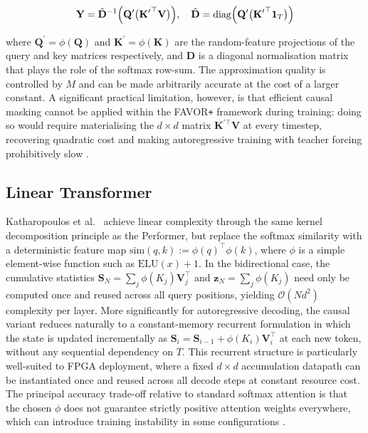 \begin{equation}
  \mathbf{Y} = \hat{\mathbf{D}}^{-1}\Bigl(
    \mathbf{Q}^\prime\bigl({\mathbf{K}^\prime}^\top \mathbf{V}\bigr)
  \Bigr), \quad
  \hat{\mathbf{D}} = \operatorname{diag}\Bigl(
    \mathbf{Q}^\prime\bigl({\mathbf{K}^\prime}^\top \mathbf{1}_T\bigr)
  \Bigr)
  \label{eq:favor}
\end{equation}

\noindent where $\mathbf{Q}^\prime = \phi(\mathbf{Q})$ and
$\mathbf{K}^\prime = \phi(\mathbf{K})$ are the random-feature projections of
the query and key matrices respectively, and $\hat{\mathbf{D}}$ is a
diagonal normalisation matrix that plays the role of the softmax row-sum.
The approximation quality is controlled by $M$ and can be made arbitrarily
accurate at the cost of a larger constant. A significant practical
limitation, however, is that efficient causal masking cannot be applied
within the FAVOR\texttt{+} framework during training: doing so would require
materialising the $d \times d$ matrix $\mathbf{K}^{\prime\top}\mathbf{V}$
at every timestep, recovering quadratic cost and making autoregressive
training with teacher forcing prohibitively slow \cite{choromanski2021performer}.

\subsection{Linear Transformer}
\label{subsec:linear_transformer}

Katharopoulos et al.\ \cite{katharopoulos2020linear} achieve linear complexity through
the same kernel decomposition principle as the Performer, but replace the
softmax similarity with a deterministic feature map
$\text{sim}(q, k) := \phi(q)^\top\phi(k)$, where $\phi$ is a simple
element-wise function such as $\text{ELU}(x) + 1$. In the bidirectional
case, the cumulative statistics $\mathbf{S}_N = \sum_j
\phi(K_j)\mathbf{V}_j^\top$ and $\mathbf{z}_N = \sum_j \phi(K_j)$ need
only be computed once and reused across all query positions, yielding
$\mathcal{O}(Nd^2)$ complexity per layer. More significantly for
autoregressive decoding, the causal variant reduces naturally to a
constant-memory recurrent formulation in which the state is updated
incrementally as $\mathbf{S}_i = \mathbf{S}_{i-1} +
\phi(K_i)\mathbf{V}_i^\top$ at each new token, without any sequential
dependency on $T$. This recurrent structure is particularly well-suited to
FPGA deployment, where a fixed $d \times d$ accumulation datapath can be
instantiated once and reused across all decode steps at constant resource
cost. The principal accuracy trade-off relative to standard softmax
attention is that the chosen $\phi$ does not guarantee strictly positive
attention weights everywhere, which can introduce training instability in
some configurations \cite{katharopoulos2020linear}.

